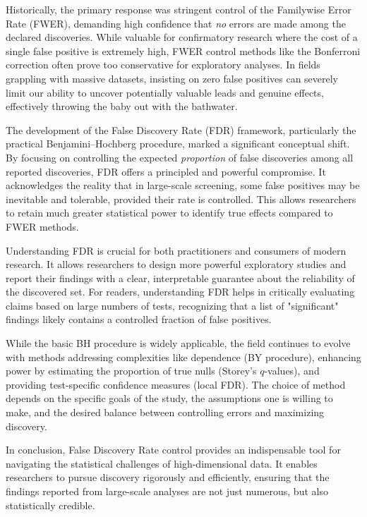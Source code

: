 \documentclass[12pt]{book}
\newcommand{\qvalue}{$q$-value}          %
\begin{document}
Historically, the primary response was stringent control of the Familywise Error Rate (FWER), demanding high confidence that \emph{no} errors are made among the declared discoveries. While valuable for confirmatory research where the cost of a single false positive is extremely high, FWER control methods like the Bonferroni correction often prove too conservative for exploratory analyses. In fields grappling with massive datasets, insisting on zero false positives can severely limit our ability to uncover potentially valuable leads and genuine effects, effectively throwing the baby out with the bathwater.

The development of the False Discovery Rate (FDR) framework, particularly the practical Benjamini–Hochberg procedure, marked a significant conceptual shift. By focusing on controlling the expected \emph{proportion} of false discoveries among all reported discoveries, FDR offers a principled and powerful compromise. It acknowledges the reality that in large-scale screening, some false positives may be inevitable and tolerable, provided their rate is controlled. This allows researchers to retain much greater statistical power to identify true effects compared to FWER methods.

Understanding FDR is crucial for both practitioners and consumers of modern research. It allows researchers to design more powerful exploratory studies and report their findings with a clear, interpretable guarantee about the reliability of the discovered set. For readers, understanding FDR helps in critically evaluating claims based on large numbers of tests, recognizing that a list of "significant" findings likely contains a controlled fraction of false positives.

While the basic BH procedure is widely applicable, the field continues to evolve with methods addressing complexities like dependence (BY procedure), enhancing power by estimating the proportion of true nulls (Storey's \qvalue s), and providing test-specific confidence measures (local FDR). The choice of method depends on the specific goals of the study, the assumptions one is willing to make, and the desired balance between controlling errors and maximizing discovery.

In conclusion, False Discovery Rate control provides an indispensable tool for navigating the statistical challenges of high-dimensional data. It enables researchers to pursue discovery rigorously and efficiently, ensuring that the findings reported from large-scale analyses are not just numerous, but also statistically credible.
\end{document}
